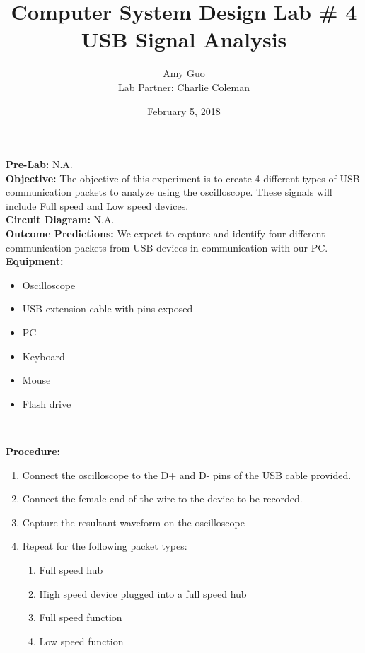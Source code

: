 \documentclass{article}
\title{Computer System Design Lab \# 4\\USB Signal Analysis}
\author{Amy Guo \\ Lab Partner: Charlie Coleman}
\date{February 5, 2018}
\newcommand{\sect}[1]{\noindent\textbf{#1}}
\begin{document}
\maketitle
\pagebreak

\sect{Pre-Lab:} N.A.\\

\sect{Objective:} The objective of this experiment is to create 4 different types of USB communication packets to analyze using the oscilloscope. These signals will include Full speed and Low speed devices.\\

\sect{Circuit Diagram:} N.A.\\

\sect{Outcome Predictions:} We expect to capture and identify four different communication packets from USB devices in communication with our PC.\\

\sect{Equipment:}

\begin{itemize}[noitemsep, nolistsep]
	\item Oscilloscope
	\item USB extension cable with pins exposed
	\item PC
	\item Keyboard
	\item Mouse
	\item Flash drive
\end{itemize}~

\sect{Procedure:}

\begin{enumerate}
	\item Connect the oscilloscope to the D+ and D- pins of the USB cable provided.
	\item Connect the female end of the wire to the device to be recorded.
	\item Capture the resultant waveform on the oscilloscope
	\item Repeat for the following packet types:
	\begin{enumerate}
		\item Full speed hub
		\item High speed device plugged into a full speed hub
		\item Full speed function
		\item Low speed function
	\end{enumerate}
\end{enumerate}~
\end{document}
